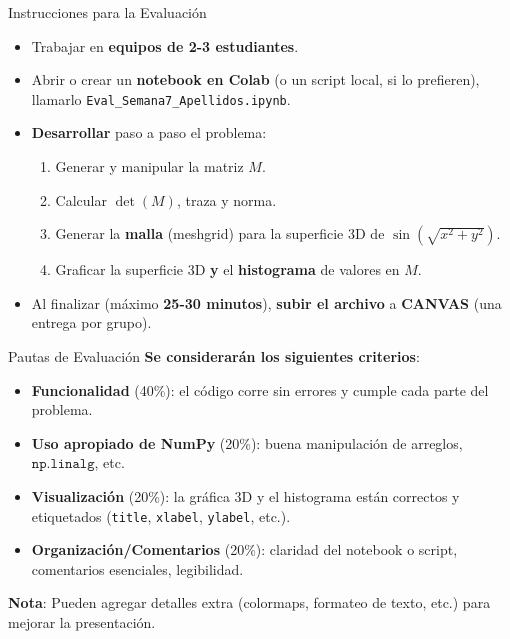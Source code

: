 \documentclass[10pt]{beamer}
\begin{document}
\begin{frame}{Instrucciones para la Evaluación}
  \begin{itemize}
    \item Trabajar en \textbf{equipos de 2-3 estudiantes}.
    \item Abrir o crear un \textbf{notebook en Colab} (o un script local, si lo prefieren), llamarlo \texttt{Eval\_Semana7\_Apellidos.ipynb}.
    \item \textbf{Desarrollar} paso a paso el problema:
      \begin{enumerate}
        \item Generar y manipular la matriz \(M\).
        \item Calcular \(\det(M)\), traza y norma.
        \item Generar la \textbf{malla} (meshgrid) para la superficie 3D de \(\sin(\sqrt{x^2 + y^2})\).
        \item Graficar la superficie 3D \textbf{y} el \textbf{histograma} de valores en \(M\).
      \end{enumerate}
    \item Al finalizar (máximo \textbf{25-30 minutos}), \textbf{subir el archivo} a \textbf{CANVAS} (una entrega por grupo).
  \end{itemize}
\end{frame}

\begin{frame}{Pautas de Evaluación}
  \textbf{Se considerarán los siguientes criterios}:
  \begin{itemize}
    \item \textbf{Funcionalidad} (40\%): el código corre sin errores y cumple cada parte del problema.
    \item \textbf{Uso apropiado de NumPy} (20\%): buena manipulación de arreglos, \(\texttt{np.linalg}\), etc.
    \item \textbf{Visualización} (20\%): la gráfica 3D y el histograma están correctos y etiquetados (\texttt{title}, \texttt{xlabel}, \texttt{ylabel}, etc.).
    \item \textbf{Organización/Comentarios} (20\%): claridad del notebook o script, comentarios esenciales, legibilidad.
  \end{itemize}
  \vspace{0.3cm}
  \textbf{Nota}: Pueden agregar detalles extra (colormaps, formateo de texto, etc.) para mejorar la presentación.
\end{frame}
\end{document}
